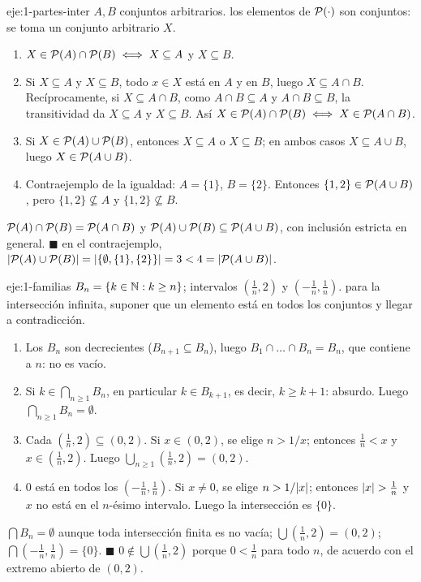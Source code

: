 \begin{solucion}{eje:1-partes-inter}
\datos $A,B$ conjuntos arbitrarios.
\planteamiento los elementos de $\mathcal{P}(\cdot)$ son conjuntos: se toma un conjunto arbitrario $X$.
\pasos
\begin{enumerate}[label=\arabic*.]
  \item $X\in\mathcal{P}(A)\cap\mathcal{P}(B)\iff X\subseteq A$ y $X\subseteq B$.
  \item Si $X\subseteq A$ y $X\subseteq B$, todo $x\in X$ está en $A$ y en $B$, luego $X\subseteq A\cap B$. Recíprocamente, si $X\subseteq A\cap B$, como $A\cap B\subseteq A$ y $A\cap B\subseteq B$, la transitividad da $X\subseteq A$ y $X\subseteq B$. Así $X\in\mathcal{P}(A)\cap\mathcal{P}(B)\iff X\in\mathcal{P}(A\cap B)$.
  \item Si $X\in\mathcal{P}(A)\cup\mathcal{P}(B)$, entonces $X\subseteq A$ o $X\subseteq B$; en ambos casos $X\subseteq A\cup B$, luego $X\in\mathcal{P}(A\cup B)$.
  \item Contraejemplo de la igualdad: $A=\{1\}$, $B=\{2\}$. Entonces $\{1,2\}\in\mathcal{P}(A\cup B)$, pero $\{1,2\}\not\subseteq A$ y $\{1,2\}\not\subseteq B$.
\end{enumerate}
\resultado $\mathcal{P}(A)\cap\mathcal{P}(B)=\mathcal{P}(A\cap B)$ y $\mathcal{P}(A)\cup\mathcal{P}(B)\subseteq\mathcal{P}(A\cup B)$, con inclusión estricta en general. \hfill$\blacksquare$
\comprobacion en el contraejemplo, $\lvert\mathcal{P}(A)\cup\mathcal{P}(B)\rvert=\lvert\{\emptyset,\{1\},\{2\}\}\rvert=3<4=\lvert\mathcal{P}(A\cup B)\rvert$.
\end{solucion}

\begin{solucion}{eje:1-familias}
\datos $B_n=\{k\in\mathbb{N}: k\ge n\}$; intervalos $(\tfrac1n,2)$ y $(-\tfrac1n,\tfrac1n)$.
\planteamiento para la intersección infinita, suponer que un elemento está en todos los conjuntos y llegar a contradicción.
\pasos
\begin{enumerate}[label=\arabic*.]
  \item Los $B_n$ son decrecientes ($B_{n+1}\subseteq B_n$), luego $B_1\cap\dots\cap B_n=B_n$, que contiene a $n$: no es vacío.
  \item Si $k\in\bigcap_{n\ge1}B_n$, en particular $k\in B_{k+1}$, es decir, $k\ge k+1$: absurdo. Luego $\bigcap_{n\ge1}B_n=\emptyset$.
  \item Cada $(\tfrac1n,2)\subseteq(0,2)$. Si $x\in(0,2)$, se elige $n>1/x$; entonces $\tfrac1n<x$ y $x\in(\tfrac1n,2)$. Luego $\bigcup_{n\ge1}(\tfrac1n,2)=(0,2)$.
  \item $0$ está en todos los $(-\tfrac1n,\tfrac1n)$. Si $x\neq0$, se elige $n>1/\lvert x\rvert$; entonces $\lvert x\rvert>\tfrac1n$ y $x$ no está en el $n$-ésimo intervalo. Luego la intersección es $\{0\}$.
\end{enumerate}
\resultado $\bigcap B_n=\emptyset$ aunque toda intersección finita es no vacía; $\bigcup(\tfrac1n,2)=(0,2)$; $\bigcap(-\tfrac1n,\tfrac1n)=\{0\}$. \hfill$\blacksquare$
\comprobacion $0\notin\bigcup(\tfrac1n,2)$ porque $0<\tfrac1n$ para todo $n$, de acuerdo con el extremo abierto de $(0,2)$.
\end{solucion}

